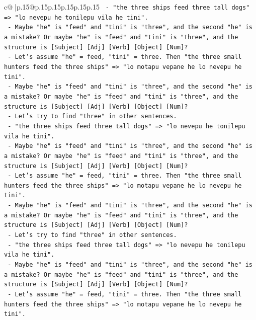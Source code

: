 \documentclass{article}
\begin{document}
{\begin{supertabular}{c@{$\;$}|p{.15\linewidth}@{}p{.15\linewidth}p{.15\linewidth}p{.15\linewidth}p{.15\linewidth}p{.15\linewidth}}
{{{\texttt{             {-} "the three ships feed three tall dogs" => "lo nevepu he tonilepu vila he tini".} \\
\texttt{             {-} Maybe "he" is "feed" and "tini" is "three", and the second "he" is a mistake? Or maybe "he" is "feed" and "tini" is "three", and the structure is {[}Subject{]} {[}Adj{]} {[}Verb{]} {[}Object{]} {[}Num{]}?} \\
\texttt{             {-} Let's assume "he" = feed, "tini" = three. Then "the three small hunters feed the three ships" => "lo motapu vepane he lo nevepu he tini".} \\
\texttt{             {-} Maybe "he" is "feed" and "tini" is "three", and the second "he" is a mistake? Or maybe "he" is "feed" and "tini" is "three", and the structure is {[}Subject{]} {[}Adj{]} {[}Verb{]} {[}Object{]} {[}Num{]}?} \\
\texttt{             {-} Let's try to find "three" in other sentences.} \\
\texttt{             {-} "the three ships feed three tall dogs" => "lo nevepu he tonilepu vila he tini".} \\
\texttt{             {-} Maybe "he" is "feed" and "tini" is "three", and the second "he" is a mistake? Or maybe "he" is "feed" and "tini" is "three", and the structure is {[}Subject{]} {[}Adj{]} {[}Verb{]} {[}Object{]} {[}Num{]}?} \\
\texttt{             {-} Let's assume "he" = feed, "tini" = three. Then "the three small hunters feed the three ships" => "lo motapu vepane he lo nevepu he tini".} \\
\texttt{             {-} Maybe "he" is "feed" and "tini" is "three", and the second "he" is a mistake? Or maybe "he" is "feed" and "tini" is "three", and the structure is {[}Subject{]} {[}Adj{]} {[}Verb{]} {[}Object{]} {[}Num{]}?} \\
\texttt{             {-} Let's try to find "three" in other sentences.} \\
\texttt{             {-} "the three ships feed three tall dogs" => "lo nevepu he tonilepu vila he tini".} \\
\texttt{             {-} Maybe "he" is "feed" and "tini" is "three", and the second "he" is a mistake? Or maybe "he" is "feed" and "tini" is "three", and the structure is {[}Subject{]} {[}Adj{]} {[}Verb{]} {[}Object{]} {[}Num{]}?} \\
\texttt{             {-} Let's assume "he" = feed, "tini" = three. Then "the three small hunters feed the three ships" => "lo motapu vepane he lo nevepu he tini".} \\
}}}
\end{supertabular}}
\end{document}
